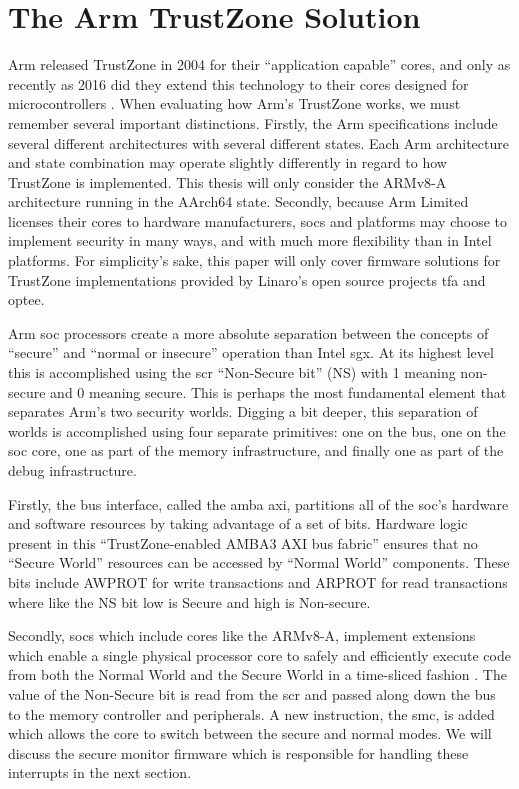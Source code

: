 \section{The Arm TrustZone Solution}
Arm released TrustZone in 2004 for their ``application capable'' cores, and only as recently as 2016 did they extend this technology to their cores designed for microcontrollers \cite{Pinto2019}. When evaluating how Arm’s TrustZone works, we must remember several important distinctions. Firstly, the Arm specifications include several different architectures with several different states. Each Arm architecture and state combination may operate slightly differently in regard to how TrustZone is implemented. This thesis will only consider the ARMv8-A architecture running in the AArch64 state. Secondly, because Arm Limited licenses their cores to hardware manufacturers, \glspl{soc} and platforms may choose to implement security in many ways, and with much more flexibility than in Intel platforms. For simplicity’s sake, this paper will only cover firmware solutions for TrustZone implementations provided by Linaro's open source projects \gls{tfa} and \gls{optee}.
 
Arm \gls{soc} processors create a more absolute separation between the concepts of ``secure'' and ``normal or insecure'' operation than Intel \gls{sgx}. At its highest level this is accomplished using the \gls{scr} ``Non-Secure bit'' (NS) with 1 meaning non-secure and 0 meaning secure. This is perhaps the most fundamental element that separates Arm's two security worlds. Digging a bit deeper, this separation of worlds is accomplished using four separate primitives: one on the bus, one on the \gls{soc} core, one as part of the memory infrastructure, and finally one as part of the debug infrastructure.

Firstly, the bus interface, called the \gls{amba} \gls{axi}, partitions all of the \gls{soc}’s hardware and software resources by taking advantage of a set of bits. Hardware logic present in this ``TrustZone-enabled AMBA3 AXI  bus fabric'' \cite{ArmBuildingSS} ensures that no ``Secure World'' resources can be accessed by ``Normal World'' components. These bits include AWPROT for write transactions and ARPROT for read transactions where like the NS bit low is Secure and high is Non-secure. 

Secondly, \gls{soc}s which include cores like the ARMv8-A, implement extensions which enable a single physical processor core to safely and efficiently execute code from both the Normal World and the Secure World in a time-sliced fashion \cite{TrustZoneExplained}. The value of the Non-Secure bit is read from the \gls{scr} and passed along down the bus to the memory controller and peripherals. A new instruction, the \gls{smc}, is added which allows the core to switch between the secure and normal modes. We will discuss the secure monitor firmware which is responsible for handling these interrupts in the next section.

